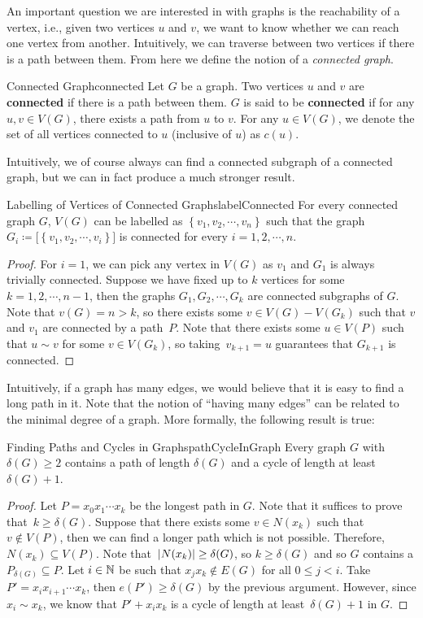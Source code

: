 \documentclass[math]{amznotes}
\theoremstyle{remark}
\begin{document}
An important question we are interested in with graphs is the reachability of a vertex, i.e., given two vertices $u$ and $v$, we want to know whether we can reach one vertex from another. Intuitively, we can traverse between two vertices if there is a path between them. From here we define the notion of a \textit{connected graph}.
\begin{dfnbox}{Connected Graph}{connected}
    Let $G$ be a graph. Two vertices $u$ and $v$ are {\color{red} \textbf{connected}} if there is a path between them. $G$ is said to be {\color{red} \textbf{connected}} if for any $u, v \in V(G)$, there exists a path from $u$ to $v$. For any $u \in V(G)$, we denote the set of all vertices connected to $u$ (inclusive of $u$) as $c(u)$.
\end{dfnbox}
Intuitively, we of course always can find a connected subgraph of a connected graph, but we can in fact produce a much stronger result.
\begin{probox}{Labelling of Vertices of Connected Graphs}{labelConnected}
    For every connected graph $G$, $V(G)$ can be labelled as $\left\{v_1, v_2, \cdots, v_n\right\}$ such that the graph~$G_i \coloneqq \bigl[\left\{v_1, v_2, \cdots, v_i\right\}\bigr]$ is connected for every $i = 1, 2, \cdots, n$.
    \tcblower
    \begin{proof}
        For $i = 1$, we can pick any vertex in $V(G)$ as $v_1$ and $G_1$ is always trivially connected. Suppose we have fixed up to $k$ vertices for some $k = 1, 2, \cdots, n - 1$, then the graphs $G_1, G_2, \cdots, G_k$ are connected subgraphs of $G$. Note that $v(G) = n > k$, so there exists some $v \in V(G) - V(G_k)$ such that $v$ and $v_1$ are connected by a path~$P$. Note that there exists some $u \in V(P)$ such that $u \sim v$ for some $v \in V(G_k)$, so taking~$v_{k + 1} = u$ guarantees that $G_{k + 1}$ is connected.
    \end{proof}
\end{probox}
Intuitively, if a graph has many edges, we would believe that it is easy to find a long path in it. Note that the notion of ``having many edges'' can be related to the minimal degree of a graph. More formally, the following result is true:
\begin{probox}{Finding Paths and Cycles in Graphs}{pathCycleInGraph}
    Every graph $G$ with $\delta(G) \geq 2$ contains a path of length $\delta(G)$ and a cycle of length at least $\delta(G) + 1$.
    \tcblower
    \begin{proof}
        Let $P = x_0x_1\cdots x_k$ be the longest path in $G$. Note that it suffices to prove that~$k \geq \delta(G)$. Suppose that there exists some $v \in N(x_k)$ such that $v \notin V(P)$, then we can find a longer path which is not possible. Therefore, $N(x_k) \subseteq V(P)$. Note that~${\left\lvert {N(x_k)} \right\rvert} \geq \delta(G)$, so $k \geq \delta(G)$ and so $G$ contains a $P_{\delta(G)} \subseteq P$. Let $i \in \mathbb{N}$ be such that $x_jx_k \notin E(G)$ for all $0 \leq j < i$. Take $P' = x_ix_{i + 1}\cdots x_k$, then $e(P') \geq \delta(G)$ by the previous argument. However, since $x_i \sim x_k$, we know that $P' + x_ix_k$ is a cycle of length at least~$\delta(G) + 1$ in $G$.
    \end{proof}
\end{probox}
\end{document}
